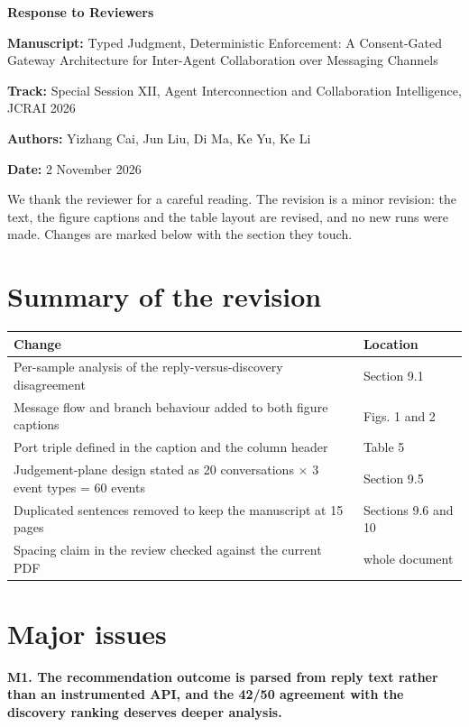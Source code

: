 \documentclass[11pt,a4paper]{article}
\begin{document}
\begin{center}{\Large\bfseries Response to Reviewers}\end{center}
\vspace{0.2em}
\textbf{Manuscript:} Typed Judgment, Deterministic Enforcement: A Consent-Gated Gateway Architecture for Inter-Agent Collaboration over Messaging Channels

\textbf{Track:} Special Session XII, Agent Interconnection and Collaboration Intelligence, JCRAI 2026

\textbf{Authors:} Yizhang Cai, Jun Liu, Di Ma, Ke Yu, Ke Li

\textbf{Date:} 2 November 2026

We thank the reviewer for a careful reading. The revision is a minor revision: the text, the figure captions and the table layout are revised, and no new runs were made. Changes are marked below with the section they touch.

\section*{Summary of the revision}
\begin{center}\small
\begin{tabularx}{\textwidth}{@{}XX@{}}
\toprule
\textbf{Change} & \textbf{Location} \\
\midrule
Per-sample analysis of the reply-versus-discovery disagreement & Section 9.1 \\
Message flow and branch behaviour added to both figure captions & Figs. 1 and 2 \\
Port triple defined in the caption and the column header & Table 5 \\
Judgement-plane design stated as 20 conversations $\times$ 3 event types = 60 events & Section 9.5 \\
Duplicated sentences removed to keep the manuscript at 15 pages & Sections 9.6 and 10 \\
Spacing claim in the review checked against the current PDF & whole document \\
\bottomrule
\end{tabularx}
\end{center}
\section*{Major issues}
\par\vspace{0.5em}\noindent \textbf{M1. The recommendation outcome is parsed from reply text rather than an instrumented API, and the 42/50 agreement with the discovery ranking deserves deeper analysis.}
\end{document}

